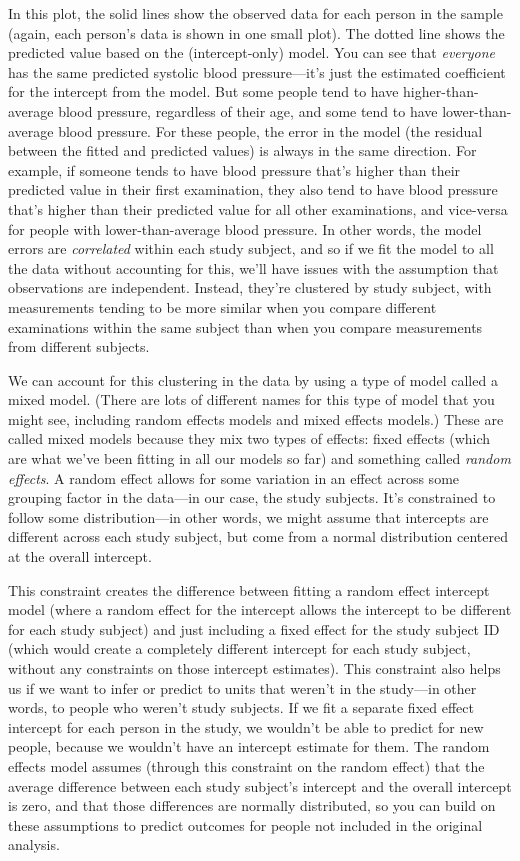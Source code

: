 \documentclass[
]{book}
\begin{document}
In this plot, the solid lines show the observed data for each person in the
sample (again, each person's data is shown in one small plot). The dotted line
shows the predicted value based on the (intercept-only) model. You can see that
\emph{everyone} has the same predicted systolic blood pressure---it's just the
estimated coefficient for the intercept from the model. But some people tend to
have higher-than-average blood pressure, regardless of their age, and some tend
to have lower-than-average blood pressure. For these people, the error in the
model (the residual between the fitted and predicted values) is always in the
same direction. For example, if someone tends to have blood pressure that's
higher than their predicted value in their first examination, they also tend to
have blood pressure that's higher than their predicted value for all other
examinations, and vice-versa for people with lower-than-average blood pressure.
In other words, the model errors are \emph{correlated} within each study subject, and
so if we fit the model to all the data without accounting for this, we'll have
issues with the assumption that observations are independent. Instead, they're
clustered by study subject, with measurements tending to be more similar when
you compare different examinations within the same subject than when you compare
measurements from different subjects.

We can account for this clustering in the data by using a type of model called a
mixed model. (There are lots of different names for this type of model that you
might see, including random effects models and mixed effects models.) These are
called mixed models because they mix two types of effects: fixed effects (which
are what we've been fitting in all our models so far) and something called
\emph{random effects}. A random effect allows for some variation in an effect across
some grouping factor in the data---in our case, the study subjects. It's
constrained to follow some distribution---in other words, we might assume that
intercepts are different across each study subject, but come from a normal
distribution centered at the overall intercept.

This constraint creates the difference between fitting a random effect intercept
model (where a random effect for the intercept allows the intercept to be
different for each study subject) and just including a fixed effect for the
study subject ID (which would create a completely different intercept for each
study subject, without any constraints on those intercept estimates). This
constraint also helps us if we want to infer or predict to units that weren't in
the study---in other words, to people who weren't study subjects. If we fit a
separate fixed effect intercept for each person in the study, we wouldn't be
able to predict for new people, because we wouldn't have an intercept estimate
for them. The random effects model assumes (through this constraint on the
random effect) that the average difference between each study subject's
intercept and the overall intercept is zero, and that those differences are
normally distributed, so you can build on these assumptions to predict outcomes
for people not included in the original analysis.
\end{document}
